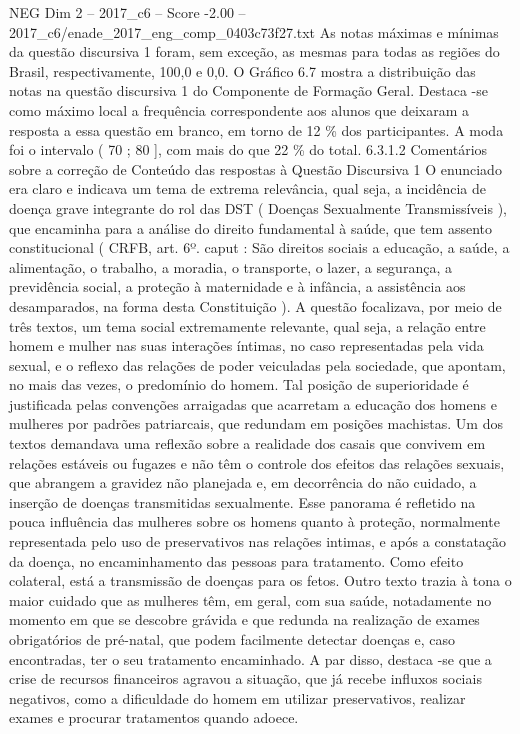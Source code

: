 \begin{textsample}{NEG Dim 2 – 2017\_c6 – Score -2.00 – 2017\_c6/enade\_2017\_eng\_comp\_0403c73f27.txt}
As notas máximas e mínimas da questão discursiva 1 foram, sem exceção, as mesmas para todas as regiões do Brasil, respectivamente, 100,0 e 0,0.
O Gráfico 6.7 mostra a distribuição das notas na questão discursiva 1 do Componente de Formação Geral.
Destaca -se como máximo local a frequência correspondente aos alunos que deixaram a resposta a essa questão em branco, em torno de 12 \% dos participantes.
A moda foi o intervalo ( 70 ; 80 ], com mais do que 22 \% do total. 6.3.1.2 Comentários sobre a correção de Conteúdo das respostas à Questão Discursiva 1 O enunciado era claro e indicava um tema de extrema relevância, qual seja, a incidência de doença grave integrante do rol das DST ( Doenças Sexualmente Transmissíveis ), que encaminha para a análise do direito fundamental à saúde, que tem assento constitucional ( CRFB, art. 6º. caput : São direitos sociais a educação, a saúde, a alimentação, o trabalho, a moradia, o transporte, o lazer, a segurança, a previdência social, a proteção à maternidade e à infância, a assistência aos desamparados, na forma desta Constituição ).
A questão focalizava, por meio de três textos, um tema social extremamente relevante, qual seja, a relação entre homem e mulher nas suas interações íntimas, no caso representadas pela vida sexual, e o reflexo das relações de poder veiculadas pela sociedade, que apontam, no mais das vezes, o predomínio do homem.
Tal posição de superioridade é justificada pelas convenções arraigadas que acarretam a educação dos homens e mulheres por padrões patriarcais, que redundam em posições machistas.
Um dos textos demandava uma reflexão sobre a realidade dos casais que convivem em relações estáveis ou fugazes e não têm o controle dos efeitos das relações sexuais, que abrangem a gravidez não planejada e, em decorrência do não cuidado, a inserção de doenças transmitidas sexualmente.
Esse panorama é refletido na pouca influência das mulheres sobre os homens quanto à proteção, normalmente representada pelo uso de preservativos nas relações intimas, e após a constatação da doença, no encaminhamento das pessoas para tratamento.
Como efeito colateral, está a transmissão de doenças para os fetos.
Outro texto trazia à tona o maior cuidado que as mulheres têm, em geral, com sua saúde, notadamente no momento em que se descobre grávida e que redunda na realização de exames obrigatórios de pré-natal, que podem facilmente detectar doenças e, caso encontradas, ter o seu tratamento encaminhado.
A par disso, destaca -se que a crise de recursos financeiros agravou a situação, que já recebe influxos sociais negativos, como a dificuldade do homem em utilizar preservativos, realizar exames e procurar tratamentos quando adoece.

\end{textsample}
